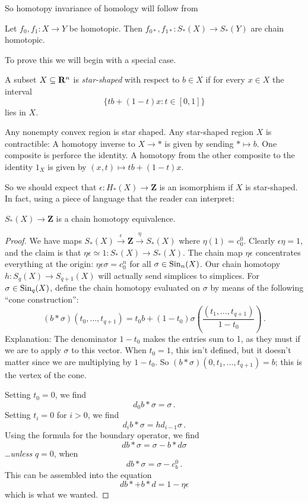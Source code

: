 So homotopy invariance of homology will follow from
\begin{prop}
Let $f_0,f_1:X\to Y$ be homotopic. Then $f_{0*},f_{1*}:S_\ast(X)\to S_\ast(Y)$ are chain homotopic.
\end{prop}

To prove this we will begin with a special case. 
\begin{definition}
A subset $X\subseteq\mathbf R^n$ is {\em star-shaped} with respect to $b\in X$ if
for every $x\in X$ the interval 
\[
\{tb+(1-t)x:t\in[0,1]\}
\]
lies in $X$. 
\end{definition}


Any nonempty convex region is star shaped.
Any star-shaped region $X$ is contractible: A homotopy 
inverse to $X\to\ast$ is given by sending $\ast\mapsto b$. One composite is
perforce the identity. A homotopy from the other composite to the identity
$1_X$ is given by $(x,t)\mapsto tb+(1-t)x$.

So we should expect that $\epsilon:H_*(X)\to\mathbf{Z}$ is an isomorphism 
if $X$ is star-shaped. In fact, using a piece of language that the reader
can interpret:
\begin{prop}
$S_*(X)\to\mathbf{Z}$ is a chain homotopy equivalence.
\end{prop}

		\begin{proof}
		We have maps $S_\ast(X)\xrightarrow{\epsilon}\mathbf{Z}\xrightarrow{\eta}S_\ast(X)$ where $\eta(1)=c_0^0$. Clearly $\epsilon\eta=1$, and the claim is that $\eta\epsilon\simeq1:S_\ast(X)\to S_\ast(X)$. The chain map 
$\eta\epsilon$ concentrates everything at the origin: 
$\eta\epsilon\sigma=c_0^n$ for all $\sigma\in\mathrm{Sin}_n(X)$. 
Our chain homotopy $h:S_q(X)\to S_{q+1}(X)$ will actually send simplices to simplices. For $\sigma\in\mathrm{Sin}_q(X)$, define the chain homotopy evaluated on $\sigma$ by means of the following ``cone construction'':
\[
(b*\sigma)(t_0,\ldots,t_{q+1})=t_0b+(1-t_0)\sigma\left(\frac{(t_1,\ldots,t_{q+1})}{1-t_0}\right)\,.
\]
Explanation: The denominator $1-t_0$ makes the entries sum to 1, as they must if we are to apply $\sigma$ to this vector. When $t_0=1$, this isn't defined, but it doesn't matter since we are multiplying by $1-t_0$. So
$(b*\sigma)(0,t_1,\ldots,t_{q+1})=b$; this is the vertex of the cone. 


Setting $t_0=0$, we find
\[
d_0b*\sigma=\sigma\,.
\]
Setting $t_i=0$ for $i>0$, we find
\[
d_ib*\sigma=hd_{i-1}\sigma\,.
\]
Using the formula for the boundary operator, we find
\[
db*\sigma=\sigma-b*d\sigma
\]
\ldots {\em unless} $q=0$, when 
\[
db*\sigma=\sigma-c_b^0\,.
\]
This can be assembled into the equation
\[
db*+b*d=1-\eta\epsilon
\]
which is what we wanted. 		
\end{proof}




